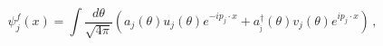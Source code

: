 \begin{equation}
\psi _{j}^{f}(x)=\int \frac{d\theta }{\sqrt{4\pi }}\left( a_{j}(\theta
)u_{j}(\theta )e^{-ip_{j}\cdot x}+a_{_{\bar{\jmath}}}^{\dagger }(\theta
)v_{j}(\theta )e^{ip_{j}\cdot x}\right) \,,\qquad  \label{free}
\end{equation}

